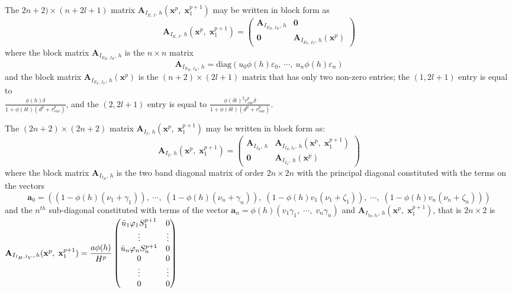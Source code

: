 \documentclass[a4paper]{article}
\newcommand{\diag}{\mathrm{diag}}
\newcommand{\varpiVar}{r_{suc}}
\newcommand{\hatmuVar}{d_q}
\begin{document}
{\noindent
The $2n+2)\times (n+2l+1)$ matrix  $ \mathbf A_{I_{E,\,I},\,h}(\mathbf x^p,\;\mathbf x_1^{p+1})$ may be written in block form as $$ \mathbf A_{I_{E,\,I},\,h}(\mathbf x^p,\;\mathbf x_1^{p+1}) = \begin{pmatrix} \mathbf  A_{I_{{E_H},\,{I_H}},\,h}
	&   \mathbf 0 \\ \mathbf 0 &  \mathbf
	A_{I_{{E_V},\,{I_V}},\,h}(\mathbf x^p) \end{pmatrix} $$ where the block matrix $\mathbf  A_{I_{{E_H},\,{I_H}},\,h}$ is the $n\times n$ matrix $$\mathbf  A_{I_{{E_H},\,{I_H}},\,h}=\diag(u_0\phi(h)\varepsilon_{0},~\cdots,~ u_n\phi(h)\varepsilon_{n})$$ and the block matrix $\mathbf
A_{I_{{E_V},\,{I_V}},\,h}(\mathbf x^p)$ is the $(n+2)\times (2l+1)$ matrix that has only two non-zero entries; the $(1,2l+1)$ entry is equal to \\$\frac{\phi(h) \delta}{1+\phi(\delta t)(d^{p}+\varpiVar ^{p})}$, and the $(2,2l+1)$ entry is equal to $\frac{{\phi(\delta t)}^2 \varpiVar ^{p}\delta}{1+\phi(\delta t)(d^{p}+\varpiVar ^{p})}$. %
 

\noindent 
The $(2n+2)\times (2n+2)$  matrix
$\mathbf
A_{I_I,\,h}(\mathbf x^p,\;\mathbf x_1^{p+1})$ may be written in block  form as: $$\mathbf
A_{I_I,\,h}(\mathbf x^p,\;\mathbf x_1^{p+1})=\begin{pmatrix}\mathbf A_{I_{I_H},\,h}&\mathbf A_{I_{I_H, I_V},\,h}(\mathbf x^p,\;\mathbf x_1^{p+1}) \\\mathbf 0 &\mathbf A_{I_{I_V},\,h}(\mathbf x^p)\end{pmatrix}$$  where
%
the block matrix $\mathbf A_{I_{I_H},\,h}$ is the two band diagonal matrix of order $2n\times 2n$ with the principal diagonal constituted with the terms on the vectors $$\mathbf a_0 = \left((1-\phi(h)(\nu_1+\gamma_1))
,\;\cdots,\;(1-\phi(h)(\nu_n+\gamma_n)),\;(1-\phi(h)v_1(\nu_1+\zeta_1)),\;\cdots,\;(1-\phi(h)v_n(\nu_n+\zeta_n))\right)$$  and the $n^{th}$ sub-diagonal constituted with terms of the vector $\mathbf a_n = \phi(h)\left(v_1\gamma_1,\; \cdots,\; v_n\gamma_n\right)$ and $\mathbf A_{I_{I_H, I_V},\,h}(\mathbf x^p,\;\mathbf x_1^{p+1})$, that is $2n\times2$ is $\mathbf A_{I_{I_H, I_V},\,h}(\mathbf x^p,\;\mathbf x_1^{p+1}) = \dfrac{a\phi(h)}{H^p}\begin{pmatrix}
	\bar u_1\varphi_1 S_1^{p+1}&0\cr\vdots&\vdots\cr\bar u_n\varphi_n S_n^{p+1}&0\cr0&0\cr\vdots&\vdots\cr0&0
\end{pmatrix}$

}
\end{document}
